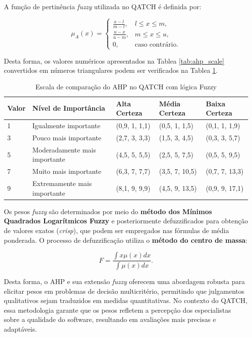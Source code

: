 A função de pertinência \textit{fuzzy} utilizada no QATCH é definida por:

\[
\mu_A(x) = \begin{cases} 
\frac{x - l}{m - l}, & l \leq x \leq m, \\ 
\frac{u - x}{u - m}, & m \leq x \leq u, \\ 
0, & \text{caso contrário}. 
\end{cases}
\]

Desta forma, os valores numéricos apresentados na Tablea \ref{tab:ahp_scale} convertidos em números triangulares podem ser verificados na Tablea \ref{tab:ahp_fuzzy_scale}.


\begin{table}[h]
\centering
\caption{Escala de comparação do AHP no QATCH com lógica Fuzzy}
\label{tab:ahp_fuzzy_scale}
\begin{tabular}{|p{1cm}|p{3.75cm}|p{2.75cm}|p{2.75cm}|p{2.75cm}|}
\hline
\textbf{Valor} & \textbf{Nível de Importância} & \textbf{Alta Certeza} & \textbf{Média Certeza} & \textbf{Baixa Certeza} \\ \hline
1 & Igualmente importante & (0,9, 1, 1,1) & (0,5, 1, 1,5) & (0,1, 1, 1,9) \\ \hline
3 & Pouco mais importante & (2,7, 3, 3,3) & (1,5, 3, 4,5) & (0,3, 3, 5,7) \\ \hline
5 & Moderadamente mais importante & (4,5, 5, 5,5) & (2,5, 5, 7,5) & (0,5, 5, 9,5) \\ \hline
7 & Muito mais importante & (6,3, 7, 7,7) & (3,5, 7, 10,5) & (0,7, 7, 13,3) \\ \hline
9 & Extremamente mais importante & (8,1, 9, 9,9) & (4,5, 9, 13,5) & (0,9, 9, 17,1) \\ \hline
\end{tabular}
\end{table}


Os pesos \textit{fuzzy} são determinados por meio do \textbf{método dos Mínimos Quadrados Logarítmicos Fuzzy} e posteriormente defuzzificados para obtenção de valores exatos (\textit{crisp}), que podem ser empregados nas fórmulas de média ponderada. O processo de defuzzificação utiliza o \textbf{método do centro de massa}:

\[
F = \frac{\int x \mu(x) dx}{\int \mu(x) dx}.
\]



Desta forma, o AHP e sua extensão \textit{fuzzy} oferecem uma abordagem robusta para elicitar pesos em problemas de decisão multicritério, permitindo que julgamentos qualitativos sejam traduzidos em medidas quantitativas. No contexto do QATCH, essa metodologia garante que os pesos refletem a percepção dos especialistas sobre a qualidade do software, resultando em avaliações mais precisas e adaptáveis.

